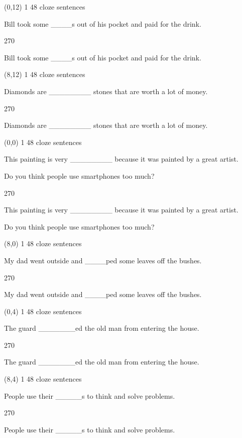 \documentclass[a4paper]{article}
\newenvironment{itemize*}%
{\begin{itemize}%
 \setlength{\itemsep}{0.5cm}%
 \setlength{\parsep}{0pt}%
 \setlength{\parskip}{0pt}}%
{\end{itemize}}
\newcommand{\mycard}[3]{%
	\small #1 #2
	\par
	\parbox[t][6.8cm][c]{9.5cm}{%
	\par
	\myleft{#3}
	\par
	\myright{#3}
	}
}
\newcommand{\myleft}[1]{%
	\begin{sideways}
	\hspace*{-0.9cm}
		\parbox[t][2.7cm][t]{6.5cm}{%
		\large #1
		}
	\end{sideways}
}
\newcommand{\myright}[1]{%
	\hspace*{6.5cm}
	\begin{turn}{270}
	\hspace*{-7.1cm}
		\parbox[t][2.7cm][t]{6.5cm}{%
		\large #1
		}
	\end{turn}
}
\begin{document}
\begin{textblock}{8}(0,12)
\mycard{1}{48 cloze sentences}{
\begin{itemize*}
\item Bill took some \_\_\_\_s out of his pocket and paid for the drink.
\end{itemize*}
}
\end{textblock}

\begin{textblock}{8}(8,12)
\mycard{1}{48 cloze sentences}{
\begin{itemize*}
\item Diamonds are \_\_\_\_\_\_\_\_ stones that are worth a lot of money.
\end{itemize*}
}
\end{textblock}

\null
\newpage

\begin{textblock}{8}(0,0)
\mycard{1}{48 cloze sentences}{
\begin{itemize*}
\item This painting is very \_\_\_\_\_\_\_\_ because it was painted by a great artist.
\item Do you think people use smartphones too much?
\end{itemize*}
}
\end{textblock}

\begin{textblock}{8}(8,0)
\mycard{1}{48 cloze sentences}{
\begin{itemize*}
\item My dad went outside and \_\_\_\_ped some leaves off the bushes.
\end{itemize*}
}
\end{textblock}

\begin{textblock}{8}(0,4)
\mycard{1}{48 cloze sentences}{
\begin{itemize*}
\item The guard \_\_\_\_\_\_\_ed the old man from entering the house.
\end{itemize*}
}
\end{textblock}

\begin{textblock}{8}(8,4)
\mycard{1}{48 cloze sentences}{
\begin{itemize*}
\item People use their \_\_\_\_\_s to think and solve problems.
\end{itemize*}
}
\end{textblock}
\end{document}
